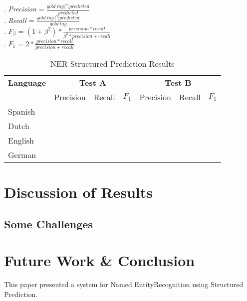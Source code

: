 \documentclass[11pt]{article}
\newcommand{\namedentity}{Named Entity}
\begin{document}
\ex. \emph{Precision} = $ \frac{gold\; tag \bigcap predicted}{predicted}$ \label{Precision}\\


\ex. \emph{Recall} = $ \frac{gold \;tag \bigcap predicted}{gold\; tag}$ \label{Recall}\\


\ex. $F_{\beta}$ = $ (1+\beta^2)*\frac{precision *recall}{\beta^2* precision + recall}$ \label{Fscore}\\

\ex. $F_1$ = $ 2*\frac{precision *recall}{precision + recall}$ \label{F1}\\




\begin{table}[h!]
\scriptsize
\begin{tabular}{| l | l l l| l l l |}

\hline
\bf Language & \multicolumn{3}{c|}{ \bf Test A}&\multicolumn{3}{c|}{ \bf Test B}\\
             & Precision & Recall & $F_1$ & Precision & Recall & $F_1$ \\ \hline
Spanish &       &          &     &          &               & \\
Dutch  &         &          &     &          &               &   \\
English &        &          &     &          &               &       \\
German &      &          &       &          &             & \\
\hline
\end{tabular}
\caption{NER Structured Prediction Results }
\label{table:Results}
\end{table}

\section{Discussion of Results}

\subsection*{Some Challenges} %


\section{Future Work \& Conclusion}

This paper presented a system for \namedentity Recognition using Structured Prediction. 




\end{document}
